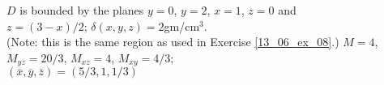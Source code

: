 {$D$ is bounded by the planes $y=0$, $y=2$,  $x=1$, $z=0$ and\\
 $z=(3-x)/2$; \quad $\delta(x,y,z) = 2$gm/cm$^3$.\\
(Note: this is the same region as used in Exercise \ref{13_06_ex_08}.)
}
{$M = 4$, $M_{yz} = 20/3$, $M_{xz}=4$, $M_{xy}=4/3$;\\
$(\overline{x},\overline{y},\overline{z}) = (5/3, 1, 1/3)$
}
